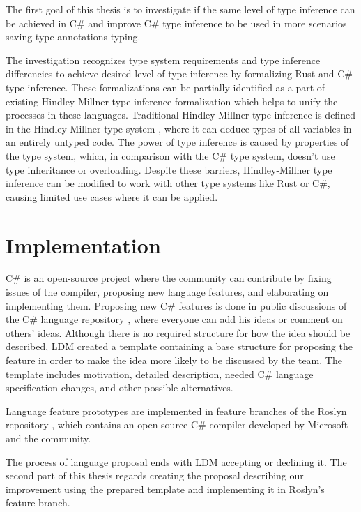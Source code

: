 The first goal of this thesis is to investigate if the same level of type inference can be achieved in C\# and improve C\# type inference to be used in more scenarios saving type annotations typing.
\par
The investigation recognizes type system requirements and type inference differencies to achieve desired level of type inference by formalizing Rust and C\# type inference.
These formalizations can be partially identified as a part of existing Hindley-Millner \cite{online:yHM} type inference formalization which helps to unify the processes in these languages.
Traditional Hindley-Millner type inference is defined in the Hindley-Millner type system \cite{online:wikiHM}, where it can deduce types of all variables in an entirely untyped code. 
The power of type inference is caused by properties of the type system, which, in comparison with the C\# type system, doesn't use type inheritance or overloading. 
Despite these barriers, Hindley-Millner type inference can be modified to work with other type systems like Rust or C\#, causing limited use cases where it can be applied.

\section{Implementation}

C\# is an open-source project where the community can contribute by fixing issues of the compiler, proposing new language features, and elaborating on implementing them. 
Proposing new C\# features is done in public discussions of the C\# language repository \cite{online:langRepo}, where everyone can add his ideas or comment on others' ideas. 
Although there is no required structure for how the idea should be described, \ac{LDM} created a template \cite{online:proposalTemplate} containing a base structure for proposing the feature in order to make the idea more likely to be discussed by the team. 
The template includes motivation, detailed description, needed C\# language specification \cite{online:langSpec} changes, and other possible alternatives.
\par
{}
Language feature prototypes are implemented in feature branches of the Roslyn repository \cite{online:roslynRepo}, which contains an open-source C\# compiler developed by Microsoft and the community.
\par
{}
The process of language proposal ends with \ac{LDM} accepting or declining it. 
The second part of this thesis regards creating the proposal describing our improvement using the prepared template and implementing it in Roslyn’s feature branch.
\par

